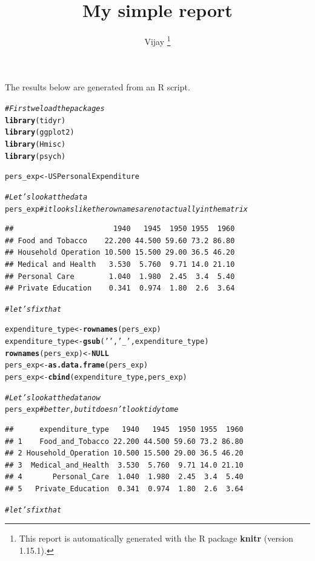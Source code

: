 \documentclass{article}\usepackage[]{graphicx}\usepackage[]{color}
\makeatletter
\newcommand{\hlstr}[1]{\textcolor[rgb]{0.192,0.494,0.8}{#1}}%
\newcommand{\hlcom}[1]{\textcolor[rgb]{0.678,0.584,0.686}{\textit{#1}}}%
\newcommand{\hlstd}[1]{\textcolor[rgb]{0.345,0.345,0.345}{#1}}%
\newcommand{\hlkwa}[1]{\textcolor[rgb]{0.161,0.373,0.58}{\textbf{#1}}}%
\newcommand{\hlkwb}[1]{\textcolor[rgb]{0.69,0.353,0.396}{#1}}%
\newcommand{\hlkwd}[1]{\textcolor[rgb]{0.737,0.353,0.396}{\textbf{#1}}}%
\newenvironment{kframe}{%
 \def\at@end@of@kframe{}%
 \ifinner\ifhmode%
  \def\at@end@of@kframe{\end{minipage}}%
  \begin{minipage}{\columnwidth}%
 \fi\fi%
 \def\FrameCommand##1{\hskip\@totalleftmargin \hskip-\fboxsep
 \colorbox{shadecolor}{##1}\hskip-\fboxsep
     \hskip-\linewidth \hskip-\@totalleftmargin \hskip\columnwidth}%
 \MakeFramed {\advance\hsize-\width
   \@totalleftmargin\z@ \linewidth\hsize
   \@setminipage}}%
 {\par\unskip\endMakeFramed%
 \at@end@of@kframe}
\newenvironment{knitrout}{}{} %
\makeatother
\begin{document}
\title{ My simple report}

\author{ Vijay%
\thanks{This report is automatically generated with the R package \textbf{knitr}
        (version 1.15.1).}}

\maketitle
The results below are generated from an R script.

\begin{knitrout}
\color{fgcolor}\begin{kframe}
\begin{alltt}
\hlcom{# First we load the packages}
\hlkwd{library}\hlstd{(tidyr)}
\hlkwd{library}\hlstd{(ggplot2)}
\hlkwd{library}\hlstd{(Hmisc)}
\hlkwd{library}\hlstd{(psych)}

\hlstd{pers_exp} \hlkwb{<-} \hlstd{USPersonalExpenditure}

\hlcom{# Let's look at the data}
\hlstd{pers_exp}        \hlcom{#it looks like the row names are not actually in the matrix}
\end{alltt}
\begin{verbatim}
##                       1940   1945  1950 1955  1960
## Food and Tobacco    22.200 44.500 59.60 73.2 86.80
## Household Operation 10.500 15.500 29.00 36.5 46.20
## Medical and Health   3.530  5.760  9.71 14.0 21.10
## Personal Care        1.040  1.980  2.45  3.4  5.40
## Private Education    0.341  0.974  1.80  2.6  3.64
\end{verbatim}
\begin{alltt}
                \hlcom{#let's fix that}

\hlstd{expenditure_type} \hlkwb{<-} \hlkwd{rownames}\hlstd{(pers_exp)}
\hlstd{expenditure_type} \hlkwb{<-} \hlkwd{gsub}\hlstd{(} \hlstr{' '} \hlstd{,} \hlstr{'_'} \hlstd{, expenditure_type)}
\hlkwd{rownames}\hlstd{(pers_exp)} \hlkwb{<-} \hlkwa{NULL}
\hlstd{pers_exp} \hlkwb{<-} \hlkwd{as.data.frame}\hlstd{(pers_exp)}
\hlstd{pers_exp} \hlkwb{<-} \hlkwd{cbind}\hlstd{(expenditure_type,pers_exp)}

\hlcom{# Let's look at the data now}
\hlstd{pers_exp}        \hlcom{#better, but it doesn't look tidy to me}
\end{alltt}
\begin{verbatim}
##      expenditure_type   1940   1945  1950 1955  1960
## 1    Food_and_Tobacco 22.200 44.500 59.60 73.2 86.80
## 2 Household_Operation 10.500 15.500 29.00 36.5 46.20
## 3  Medical_and_Health  3.530  5.760  9.71 14.0 21.10
## 4       Personal_Care  1.040  1.980  2.45  3.4  5.40
## 5   Private_Education  0.341  0.974  1.80  2.6  3.64
\end{verbatim}
\begin{alltt}
                \hlcom{#let's fix that}



\end{alltt}
\end{kframe}
\end{knitrout}
\end{document}
